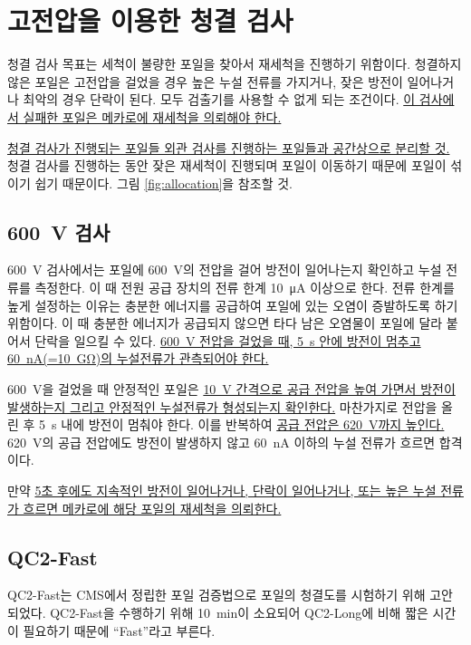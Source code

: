 \section{고전압을 이용한 청결 검사}
청결 검사 목표는 세척이 불량한 포일을 찾아서 재세척을 진행하기 위함이다. 청결하지 않은 포일은 고전압을 걸었을 경우 높은 누설 전류를 가지거나, 잦은 방전이 일어나거나 최악의 경우 단락이 된다. 모두 검출기를 사용할 수 없게 되는 조건이다. \uline{이 검사에서 실패한 포일은 메카로에 재세척을 의뢰해야 한다.}

\uline{청결 검사가 진행되는 포일들 외관 검사를 진행하는 포일들과 공간상으로 분리할 것.} 청결 검사를 진행하는 동안 잦은 재세척이 진행되며 포일이 이동하기 때문에 포일이 섞이기 쉽기 때문이다. 그림 \ref{fig:allocation}을 참조할 것.

\subsection{\SI{600}{\volt} 검사}
\SI{600}{\volt} 검사에서는 포일에 \SI{600}{\volt}의 전압을 걸어 방전이 일어나는지 확인하고 누설 전류를 측정한다. 이 때 전원 공급 장치의 전류 한계 \SI{10}{\micro\ampere} 이상으로 한다. 전류 한계를 높게 설정하는 이유는 충분한 에너지를 공급하여 포일에 있는 오염이 증발하도록 하기 위함이다. 이 때 충분한 에너지가 공급되지 않으면 타다 남은 오염물이 포일에 달라 붙어서 단락을 일으킬 수 있다. \uline{\mbox{\SI{600}{\volt}} 전압을 걸었을 때, \mbox{\SI{5}{\second}} 안에 방전이 멈추고 \mbox{\SI{60}{\nano\ampere}}(=\mbox{\SI{10}{\giga\ohm}})의 누설전류가 관측되어야 한다.}

\SI{600}{\volt}을 걸었을 때 안정적인 포일은 \uline{\mbox{\SI{10}{\volt}} 간격으로 공급 전압을 높여 가면서 방전이 발생하는지 그리고 안정적인 누설전류가 형성되는지 확인한다.} 마찬가지로 전압을 올린 후 \SI{5}{\second} 내에 방전이 멈춰야 한다. 이를 반복하여 \uline{공급 전압은 \mbox{\SI{620}{\volt}}까지 높인다.} \SI{620}{\volt}의 공급 전압에도 방전이 발생하지 않고 \SI{60}{\nano\ampere} 이하의 누설 전류가 흐르면 합격이다.

만약 \uline{5초 후에도 지속적인 방전이 일어나거나, 단락이 일어나거나, 또는 높은 누설 전류가 흐르면 메카로에 해당 포일의 재세척을 의뢰한다.}

\subsection{QC2-Fast}
QC2-Fast는 CMS에서 정립한 포일 검증법으로 포일의 청결도를 시험하기 위해 고안되었다. QC2-Fast을 수행하기 위해 \SI{10}{\minute}이 소요되어 QC2-Long에 비해 짧은 시간이 필요하기 때문에 ``Fast''라고 부른다.

